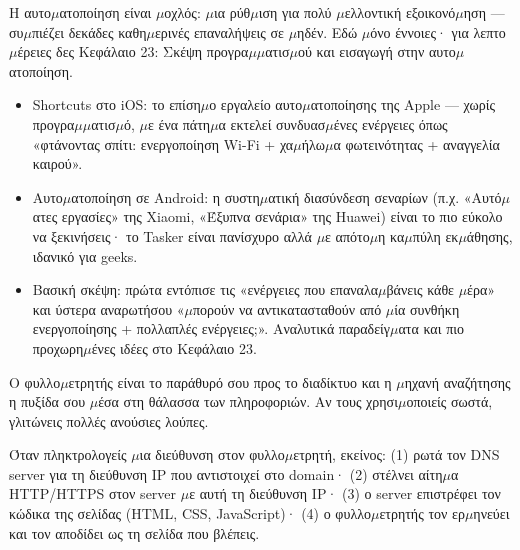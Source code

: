 
Η αυτο$\mu$ατοποίηση είναι $\mu$οχλός: $\mu$ια ρύθ$\mu$ιση για πολύ $\mu$ελλοντική εξοικονό$\mu$ηση — συ$\mu$πιέζει δεκάδες καθη$\mu$ερινές επαναλήψεις σε $\mu$ηδέν. Εδώ $\mu$όνο έννοιες· για λεπτο$\mu$έρειες δες Κεφάλαιο 23: Σκέψη προγρα$\mu$$\mu$ατισ$\mu$ού και εισαγωγή στην αυτο$\mu$ατοποίηση.

\begin{itemize}
  \item Shortcuts στο iOS: το επίση$\mu$ο εργαλείο αυτο$\mu$ατοποίησης της Apple — χωρίς προγρα$\mu$$\mu$ατισ$\mu$ό, $\mu$ε ένα πάτη$\mu$α εκτελεί συνδυασ$\mu$ένες ενέργειες όπως «φτάνοντας σπίτι: ενεργοποίηση Wi-Fi + χα$\mu$ήλω$\mu$α φωτεινότητας + αναγγελία καιρού».
  \item Αυτο$\mu$ατοποίηση σε Android: η συστη$\mu$ατική διασύνδεση σεναρίων (π.χ. «Αυτό$\mu$ατες εργασίες» της Xiaomi, «Έξυπνα σενάρια» της Huawei) είναι το πιο εύκολο να ξεκινήσεις· το Tasker είναι πανίσχυρο αλλά $\mu$ε απότο$\mu$η κα$\mu$πύλη εκ$\mu$άθησης, ιδανικό για geeks.
  \item Βασική σκέψη: πρώτα εντόπισε τις «ενέργειες που επαναλα$\mu$βάνεις κάθε $\mu$έρα» και ύστερα αναρωτήσου «$\mu$πορούν να αντικατασταθούν από $\mu$ία συνθήκη ενεργοποίησης + πολλαπλές ενέργειες;». Αναλυτικά παραδείγ$\mu$ατα και πιο προχωρη$\mu$ένες ιδέες στο Κεφάλαιο 23.
\end{itemize}


Ο φυλλο$\mu$ετρητής είναι το παράθυρό σου προς το διαδίκτυο και η $\mu$ηχανή αναζήτησης η πυξίδα σου $\mu$έσα στη θάλασσα των πληροφοριών. Αν τους χρησι$\mu$οποιείς σωστά, γλιτώνεις πολλές ανούσιες λούπες.


Όταν πληκτρολογείς $\mu$ια διεύθυνση στον φυλλο$\mu$ετρητή, εκείνος: (1) ρωτά τον DNS server για τη διεύθυνση IP που αντιστοιχεί στο domain· (2) στέλνει αίτη$\mu$α HTTP/HTTPS στον server $\mu$ε αυτή τη διεύθυνση IP· (3) ο server επιστρέφει τον κώδικα της σελίδας (HTML, CSS, JavaScript)· (4) ο φυλλο$\mu$ετρητής τον ερ$\mu$ηνεύει και τον αποδίδει ως τη σελίδα που βλέπεις.


